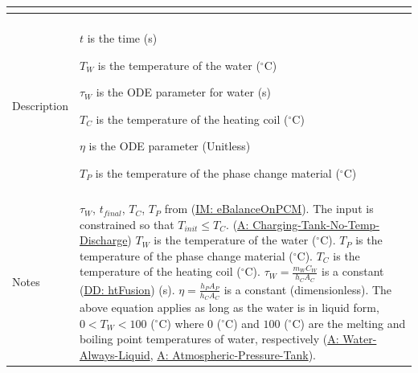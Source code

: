 \documentclass[12pt]{article}
\begin{document}
\begin{minipage}{\textwidth}
\begin{tabular}{p{} p{}}
\begin{dmath}
                                                                             \end{dmath}
                                                                             \\ \midrule \\
                                                                             Description & \begin{symbDescription}
                                                                                           \item{$t$ is the time (s)}
                                                                                           \item{${T_{W}}$ is the temperature of the water (${}^{\circ}$C)}
                                                                                           \item{${τ_{W}}$ is the ODE parameter for water (s)}
                                                                                           \item{${T_{C}}$ is the temperature of the heating coil (${}^{\circ}$C)}
                                                                                           \item{$η$ is the ODE parameter (Unitless)}
                                                                                           \item{${T_{P}}$ is the temperature of the phase change material (${}^{\circ}$C)}
                                                                                           \end{symbDescription}
                                                                                           \\ \midrule \\
                                                                                           Notes & ${τ_{W}}$, ${t_{final}}$, ${T_{C}}$, ${T_{P}}$ from (\hyperref[IM:eBalanceOnPCM]{IM: eBalanceOnPCM}). The input is constrained so that ${T_{init}}\leq{}{T_{C}}$. (\hyperref[A:Charging-Tank-No-Temp-Discharge]{A: Charging-Tank-No-Temp-Discharge}) ${T_{W}}$ is the temperature of the water (${}^{\circ}$C). ${T_{P}}$ is the temperature of the phase change material (${}^{\circ}$C). ${T_{C}}$ is the temperature of the heating coil (${}^{\circ}$C). ${τ_{W}}=\frac{{m_{W}} {C_{W}}}{{h_{C}} {A_{C}}}$ is a constant (\hyperref[DD:htFusion]{DD: htFusion}) (s). $η=\frac{{h_{P}} {A_{P}}}{{h_{C}} {A_{C}}}$ is a constant (dimensionless). The above equation applies as long as the water is in liquid form, $0<{T_{W}}<100$ (${}^{\circ}$C) where $0$ (${}^{\circ}$C) and $100$ (${}^{\circ}$C) are the melting and boiling point temperatures of water, respectively (\hyperref[A:Water-Always-Liquid]{A: Water-Always-Liquid}, \hyperref[A:Atmospheric-Pressure-Tank]{A: Atmospheric-Pressure-Tank}).

\end{tabular}
\end{minipage}
\end{document}

